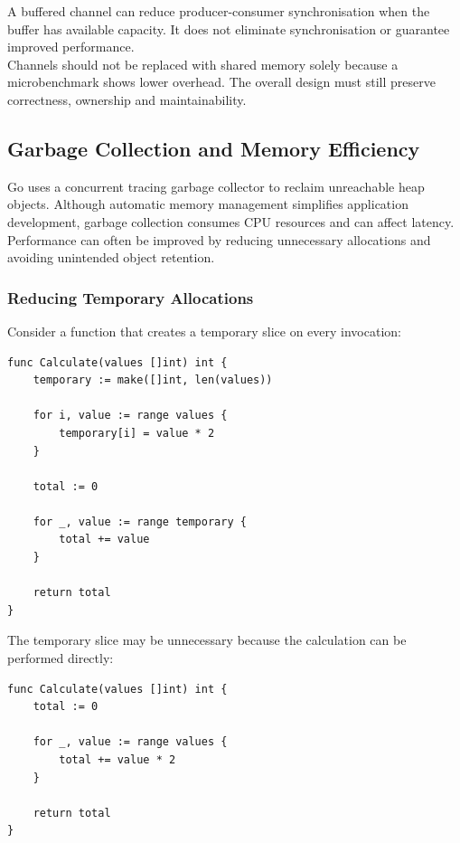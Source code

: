 A buffered channel can reduce producer-consumer synchronisation when the buffer has available capacity. It does not eliminate synchronisation or guarantee improved performance.\\

Channels should not be replaced with shared memory solely because a microbenchmark shows lower overhead. The overall design must still preserve correctness, ownership and maintainability.

\subsection{Garbage Collection and Memory Efficiency}

Go uses a concurrent tracing garbage collector to reclaim unreachable heap objects. Although automatic memory management simplifies application development, garbage collection consumes CPU resources and can affect latency.\\

Performance can often be improved by reducing unnecessary allocations and avoiding unintended object retention.

\subsubsection{Reducing Temporary Allocations}

Consider a function that creates a temporary slice on every invocation:

\begin{lstlisting}
func Calculate(values []int) int {
    temporary := make([]int, len(values))

    for i, value := range values {
        temporary[i] = value * 2
    }

    total := 0

    for _, value := range temporary {
        total += value
    }

    return total
}
\end{lstlisting}

The temporary slice may be unnecessary because the calculation can be performed directly:

\begin{lstlisting}
func Calculate(values []int) int {
    total := 0

    for _, value := range values {
        total += value * 2
    }

    return total
}
\end{lstlisting}

